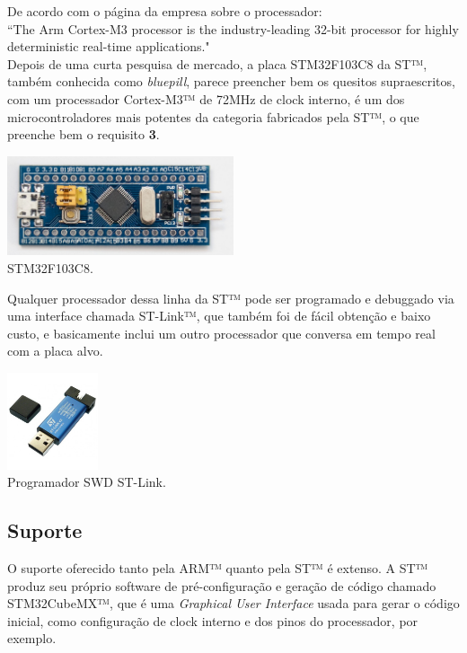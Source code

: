 \documentclass[10pt,a4paper]{report}
\begin{document}
	De acordo com o página da empresa sobre o processador:\\
	
	``The Arm Cortex-M3 processor is the industry-leading 32-bit processor for highly deterministic real-time applications."\\
	
	Depois de uma curta pesquisa de mercado, a placa STM32F103C8 da ST™, também conhecida como {\it bluepill}, parece preencher bem os quesitos supraescritos, com um processador Cortex-M3™ de 72MHz de clock interno, é um dos microcontroladores mais potentes da categoria fabricados pela ST™, o que preenche bem o requisito {\bf 3}.\\
	\begin{center}
		\includegraphics[width=0.5\textwidth]{bluepill}\\
		\footnotesize{STM32F103C8.}
	\end{center}

	
	Qualquer processador dessa linha da ST™ pode ser programado e debuggado via uma interface chamada ST-Link™, que também foi de fácil obtenção e baixo custo, e basicamente inclui um outro processador que conversa em tempo real com a placa alvo.
	\begin{center}
	\includegraphics[width=0.2\textwidth]{stlink}\\
	\footnotesize{Programador SWD ST-Link.}
	\end{center}
	
	\subsection{Suporte}
	O suporte oferecido tanto pela ARM™ quanto pela ST™ é extenso. A ST™ produz seu próprio software de pré-configuração e geração de código chamado STM32CubeMX™, que é uma {\it Graphical User Interface} usada para gerar o código inicial, como configuração de clock interno e dos pinos do processador, por exemplo.\\
	
\end{document}
